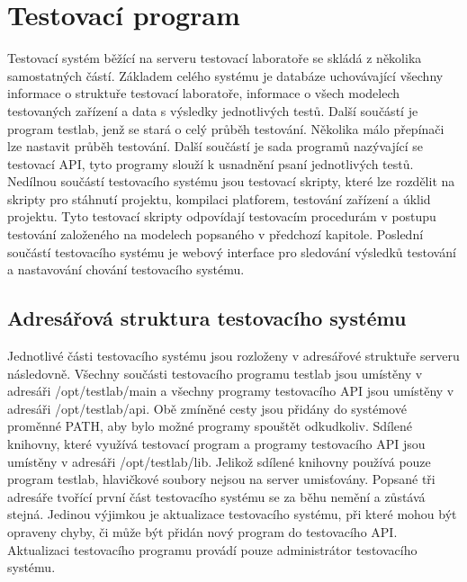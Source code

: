 \chapter{Testovací program}
Testovací systém běžící na serveru testovací laboratoře se skládá z několika samostatných částí. Základem celého systému je databáze uchovávající všechny informace o struktuře testovací laboratoře, informace o všech modelech testovaných zařízení a data s výsledky jednotlivých testů. Další součástí je program testlab, jenž se stará o celý průběh testování. Několika málo přepínači lze nastavit průběh testování. Další součástí je sada programů nazývající se testovací API, tyto programy slouží k usnadnění psaní jednotlivých testů. Nedílnou součástí testovacího systému jsou testovací skripty, které lze rozdělit na skripty pro stáhnutí projektu, kompilaci platforem, testování zařízení a úklid projektu. Tyto testovací skripty odpovídají testovacím procedurám v postupu testování založeného na modelech popsaného v předchozí kapitole. Poslední součástí testovacího systému je webový interface pro sledování výsledků testování a nastavování chování testovacího systému.

\section{Adresářová struktura testovacího systému}

Jednotlivé části testovacího systému jsou rozloženy v adresářové struktuře serveru následovně. Všechny součásti testovacího programu testlab jsou umístěny v adresáři /opt/testlab/main a všechny programy testovacího API jsou umístěny v adresáři /opt/testlab/api. Obě zmíněné cesty jsou přidány do systémové proměnné PATH, aby bylo možné programy spouštět odkudkoliv. Sdílené knihovny, které využívá testovací program a programy testovacího API jsou umístěny v adresáři /opt/testlab/lib. Jelikož sdílené knihovny používá pouze program testlab, hlavičkové soubory nejsou na server umisťovány. Popsané tři adresáře tvořící první část testovacího systému se za běhu nemění a zůstává stejná. Jedinou výjimkou je aktualizace testovacího systému, při které mohou být opraveny chyby, či může být přidán nový program do testovacího API. Aktualizaci testovacího programu provádí pouze administrátor testovacího systému.

